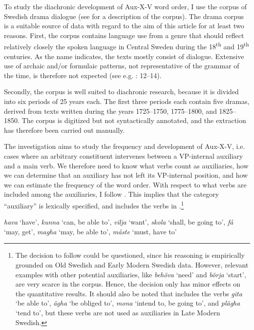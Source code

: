 \documentclass[output=paper, colorlinks, citecolor=brown]{langscibook}
\begin{document}
To study the diachronic development of Aux-X-V word order, I use the corpus of Swedish drama dialogue (see \citealt{MarttalaStromquist2001} for a description of the corpus). The drama corpus is a suitable source of data with regard to the aim of this article for at least two reasons. First, the corpus contains language use from a genre that should reflect relatively closely the spoken language in Central Sweden during the 18\textsuperscript{th} and 19\textsuperscript{th} centuries. As the name indicates, the texts mostly consist of dialogue. Extensive use of archaic and/or formulaic patterns, not representative of the grammar of the time, is therefore not expected (see e.g. \citealt{Fischer2007}: 12–14).

Secondly, the corpus is well suited to diachronic research, because it is divided into six periods of 25 years each. The first three periods each contain five dramas, derived from texts written during the years 1725–1750, 1775–1800, and 1825–1850. The corpus is digitized but not syntactically annotated, and the extraction has therefore been carried out manually.


The investigation aims to study the frequency and development of Aux-X-V, i.e. cases where an arbitrary constituent intervenes between a VP-internal auxiliary and a main verb. We therefore need to know what verbs count as auxiliaries, how we can determine that an auxiliary has not left its VP-internal position, and how we can estimate the frequency of the word order. With respect to what verbs are included among the auxiliaries, I follow \citet[162--163]{Delsing1999}. This implies that the category “auxiliary” is lexically specified, and includes the verbs in .\footnote{The decision to follow \citet{Delsing1999} could be questioned, since his reasoning is empirically grounded on Old Swedish and Early Modern Swedish data. However, relevant examples with other potential auxiliaries, like \textit{behöva} ‘need’ and \textit{börja} ‘start’, are very scarce in the corpus. Hence, the decision only has minor effects on the quantitative results. It should also be noted that \citet{Delsing1999} includes the verbs \textit{gita} ‘be able to’, \textit{ägha} ‘be obliged to’, \textit{mona} ‘intend to, be going to’, and \textit{plägha} ‘tend to’, but these verbs are not used as auxiliaries in Late Modern Swedish.}


\ea
\label{ex:sangfelt:21}
\textit{hava} ‘have’,
\textit{kunna} ‘can, be able to’,
\textit{vilja} ‘want’,
\textit{skola} ‘shall, be going to’, 
\textit{få} ‘may, get’,
\textit{magha} ‘may, be able to’,
\textit{måste} ‘must, have to’
\z 
\end{document}
